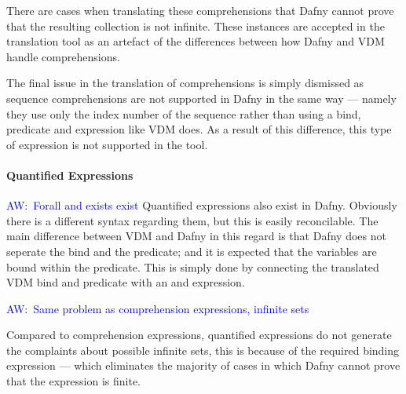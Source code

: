 \documentclass{entcs}
\newcommand{\awcomment}[1]{\ifthenelse { \boolean{showComments} } {\textcolor{blue}{AW:~#1}} { } } %
\begin{document}
There are cases when translating these comprehensions that Dafny cannot prove that the resulting collection is not infinite. These instances are accepted in the translation tool as an artefact of the differences between how Dafny and VDM handle comprehensions.

The final issue in the translation of comprehensions is simply dismissed as sequence comprehensions are not supported in Dafny in the same way --- namely they use only the index number of the sequence rather than using a bind, predicate and expression like VDM does. As a result of this difference, this type of expression is not supported in the tool.


\paragraph{Quantified Expressions}

\awcomment{Forall and exists exist}
Quantified expressions also exist in Dafny. Obviously there is a different syntax regarding them, but this is easily reconcilable. The main difference between VDM and Dafny in this regard is that Dafny does not seperate the bind and the predicate; and it is expected that the variables are bound within the predicate. This is simply done by connecting the translated VDM bind and predicate with an and expression. 

\awcomment{Same problem as comprehension expressions, infinite sets}

Compared to comprehension expressions, quantified expressions do not generate the complaints about possible infinite sets, this is because of the required binding expression --- which eliminates the majority of cases in which Dafny cannot prove that the expression is finite.
\end{document}

